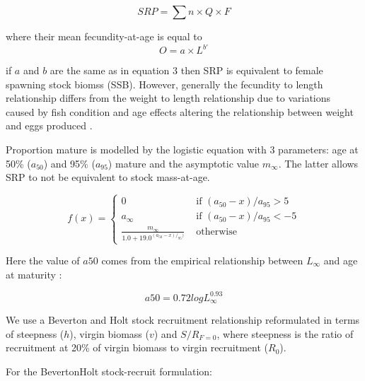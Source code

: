 \documentclass{pnastwo}
\begin{document}
\begin{article}
\begin{description}
   \begin{equation} SRP = \sum{n \times Q \times F } \end{equation}

where their mean fecundity-at-age is equal to 
\begin{equation} O	 = a \times L^{b\prime} \end{equation}

if $a$ and $b$ are the same as in equation 3 then SRP is equivalent to female spawning stock biomss (SSB). However, generally the 
fecundity to length relationship differs from the weight to length relationship due to variations caused by fish condition and age 
effects altering the relationship between weight and eggs produced \cite{perez2012study}.

Proportion mature is modelled by the logistic equation with 3 parameters: age at 50\% ($a_{50}$) and 95\% ($a_{95}$) mature and the asymptotic value $m_{\infty}$. The 
latter allows SRP to not be equivalent to stock mass-at-age.

\begin{equation}
f(x) = \left\{ \begin{array}{ll}
			0                                 &\mbox{ if $(a_{50}-x)/a_{95} >  5$} \\
			a_{\infty}                        &\mbox{ if $(a_{50}-x)/a_{95} < -5$} \\
			\frac{m_{\infty}}{1.0+19.0^{(a_{50}-x)/_{95})}} &\mbox{ otherwise}
		\end{array}
       \right.
\end{equation}

Here the value of $a50$ comes from the empirical relationship between $L_{\infty}$ and age at maturity \cite{gislason2008coexistence}:

\begin{equation}
  a50=0.72 logL_{\infty}^{0.93}
\end{equation}

We use a Beverton and Holt stock recruitment relationship reformulated in terms of steepness ($h$), virgin biomass ($v$) and $S/R_{F=0}$, 
where steepness is the ratio of recruitment at 20\% of virgin biomass to virgin recruitment ($R_0$). 

For the BevertonHolt stock-recruit formulation:


\end{description}
\end{article}
\end{document}
